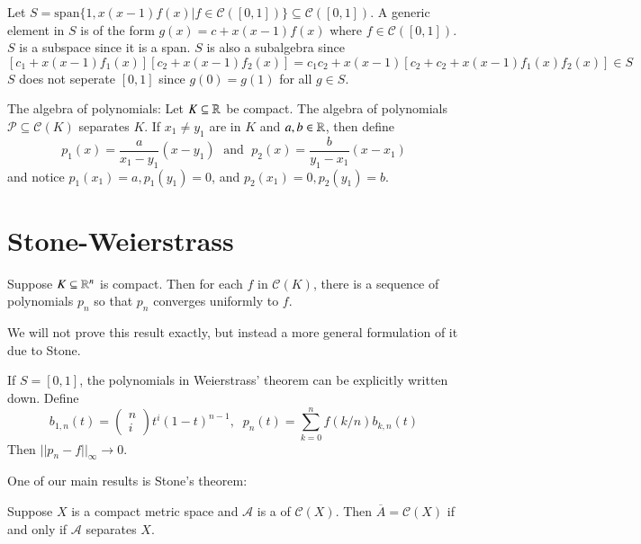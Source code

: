 \begin{eg}
    Let $S = \text{span}\{1,x(x-1)f(x)\vert f \in \mathcal{C}([0,1])\}\subseteq \mathcal{C}([0,1])$. A generic element in $S$ is of the form $g(x) = c+x(x-1)f(x)$ where $f \in \mathcal{C}([0,1])$. $S$ is a subspace since it is a span. $S$ is also a subalgebra since $$[c_1+x(x-1)f_1(x)][c_2+x(x-1)f_2(x)] = c_1c_2 + x(x-1)[c_2+c_2+x(x-1)f_1(x)f_2(x)] \in S$$ $S$ does not seperate $[0,1]$ since $g(0) = g(1)$ for all $g \in S$.
\end{eg}

\begin{eg}
    The algebra of polynomials: Let $K \subseteq \mathbb R$ be compact. The algebra of polynomials $\mathcal{P} \subseteq \mathcal{C}(K)$ separates $K$. If $x_1 \neq y_1$ are in $K$ and $a,b \in \mathbb R$, then define $$p_1(x) = \frac{a}{x_1-y_1}(x-y_1)\;\text{ and }\;p_2(x) = \frac{b}{y_1-x_1}(x-x_1)$$ and notice $p_1(x_1) = a, p_1(y_1) = 0$, and $p_2(x_1) = 0, p_2(y_1) = b$.
\end{eg}

\section{Stone-Weierstrass}

\begin{thm}[Weierstrass 1885]
    Suppose $K \subseteq \mathbb R^n$ is compact. Then for each $f$ in $\mathcal{C}(K)$, there is a sequence of polynomials $p_n$ so that $p_n$ converges uniformly to $f$.
\end{thm}

We will not prove this result exactly, but instead a more general formulation of it due to Stone.

\begin{eg}
    If $S = [0,1]$, the polynomials in Weierstrass' theorem can be explicitly written down. Define $$b_{1,n}(t) = \left(\begin{array}{c} n\\ i\end{array}\right)t^i(1-t)^{n-1},\;\;p_n(t) = \sum_{k=0}^nf(k/n)b_{k,n}(t)$$ Then $||p_n-f||_{\infty}\rightarrow 0$.
\end{eg}

One of our main results is Stone's theorem:

\begin{namthm}[Stone 1941]
    Suppose $X$ is a compact metric space and $\mathcal{A}$ is a  of $\mathcal{C}(X)$. Then $\overline{A}=\mathcal{C}(X)$ if and only if $\mathcal{A}$ separates $X$.
\end{namthm}

